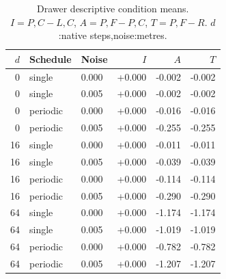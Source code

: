 \documentclass[10pt,a4paper]{article}
\begin{document}
\renewcommand{\thetable}{S\arabic{table}}
\setcounter{table}{1}
\begin{table}[H]\centering\small
\caption{Drawer descriptive condition means. $I=P,C-L,C$, $A=P,F-P,C$, $T=P,F-R$. $d$:native steps,noise:metres.}
\begin{tabular}{rllrrr}
\toprule $d$ & Schedule & Noise & $I$ & $A$ & $T$\\\midrule
0 & single & 0.000 & +0.000 & -0.002 & -0.002\\
0 & single & 0.005 & +0.000 & -0.002 & -0.002\\
0 & periodic & 0.000 & +0.000 & -0.016 & -0.016\\
0 & periodic & 0.005 & +0.000 & -0.255 & -0.255\\
16 & single & 0.000 & +0.000 & -0.011 & -0.011\\
16 & single & 0.005 & +0.000 & -0.039 & -0.039\\
16 & periodic & 0.000 & +0.000 & -0.114 & -0.114\\
16 & periodic & 0.005 & +0.000 & -0.290 & -0.290\\
64 & single & 0.000 & +0.000 & -1.174 & -1.174\\
64 & single & 0.005 & +0.000 & -1.019 & -1.019\\
64 & periodic & 0.000 & +0.000 & -0.782 & -0.782\\
64 & periodic & 0.005 & +0.000 & -1.207 & -1.207\\
\bottomrule\end{tabular}\end{table}
\end{document}
